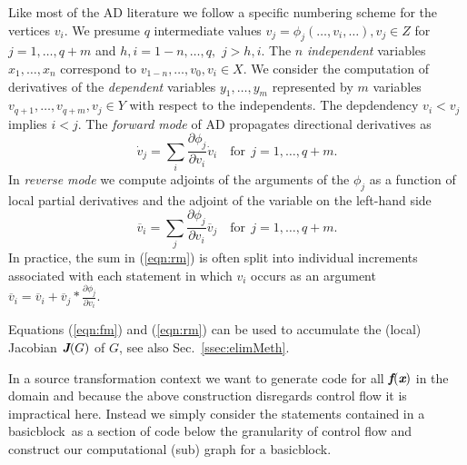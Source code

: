 \documentclass[11pt]{article}
\newcommand{\basicblock}{basicblock}
\newcommand{\bmf}{\mbox{\bf\em f}}
\newcommand{\bmJ}{\mbox{\bf\em J}}
\newcommand{\bmx}{\mbox{\bf\em x}}
\newcommand{\refsec}[1]{{Sec.~\ref{#1}}}
\newcommand{\refeqn}[1]{{(\ref{#1})}}
\begin{document}
Like most of the AD literature we follow a specific numbering scheme for the vertices $v_i$.
We presume $q$ intermediate values
$v_j = \phi_j(\ldots,v_i,\ldots), v_j\in Z$
for $j=1,\ldots,q+m$ and $h,i=1-n,\ldots,q,$ $j>h,i$. 
The $n$ {\em independent}
variables $x_1,\ldots,x_n$ correspond to 
$v_{1-n},\ldots,v_0, v_i\in X$. 
We consider the 
computation of derivatives of the {\em dependent} variables 
$y_1,\ldots,y_m$ represented by $m$ variables $v_{q+1},\ldots,v_{q+m}, v_j\in Y$
with respect to the independents. 
The depdendency $v_i<v_j$ implies $i<j$. 
The {\em forward mode} of AD propagates directional derivatives
as 
\begin{equation} \label{eqn:fm}
\dot{v}_j= \sum\limits_i\frac{\partial \phi_j}{\partial v_i}\dot{v}_i 
\quad \text{for}~~j=1,\ldots,q+m.
\end{equation} 
In {\em reverse mode} we compute adjoints of the arguments of the $\phi_j$
as a function of local partial derivatives and the 
adjoint of the variable on the left-hand side
\begin{equation} \label{eqn:rm}
\overline{v}_i= \sum\limits_j\frac{\partial \phi_j}{\partial v_i}\overline{v}_j 
\quad \text{for}~~j=1,\ldots,q+m.
\end{equation} 
In practice, the sum in \refeqn{eqn:rm} is often split into individual increments 
associated with each statement in which $v_i$ occurs as an argument 
$\overline{v}_i=\overline{v}_i+\overline{v}_j * \frac{\partial \phi_j}{\partial v_i}$.

Equations \refeqn{eqn:fm} and \refeqn{eqn:rm} can be used to accumulate 
the (local) Jacobian $\bmJ(G)$
of $G$, see also \refsec{ssec:elimMeth}. 

In a source transformation context we want to generate code for all $\bmf(\bmx)$
in the domain and because the above construction disregards control flow it is 
impractical here. Instead we simply consider the statements contained in a 
\basicblock\  as a section of code below the granularity of control flow and 
construct our computational (sub) graph for a \basicblock.   

\end{document}
